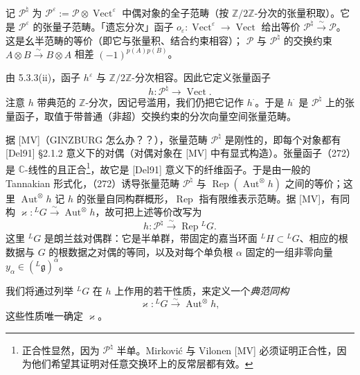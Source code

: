 记 $\mathcal{P}^{\natural}$ 为 $\mathcal{P}^{\varepsilon}:=\mathcal{P}\otimes\operatorname{Vect}^{\varepsilon}$ 中偶对象的全子范畴（按 $\mathbb{Z}/2\mathbb{Z}$-分次的张量积取）。它是 $\mathcal{P}^{\varepsilon}$ 的张量子范畴。「遗忘分次」函子 $o_{\varepsilon}:\operatorname{Vect}^{\varepsilon}\to\operatorname{Vect}$ 给出等价 $\mathcal{P}^{\natural}\xrightarrow{\sim}\mathcal{P}$。这是幺半范畴的等价（即它与张量积、结合约束相容）；
$\mathcal{P}$ 与 $\mathcal{P}^{\natural}$ 的交换约束 $A\otimes B\xrightarrow{\sim}B\otimes A$ 相差 $(-1)^{p(A)p(B)}$。

由 5.3.3(ii)，函子 $h^{\varepsilon}$ 与 $\mathbb{Z}/2\mathbb{Z}$-分次相容。因此它定义张量函子
\begin{equation}\tag{272}
h:\mathcal{P}^{\natural}\to\operatorname{Vect}.
\end{equation}
注意 $h$ 带典范的 $\mathbb{Z}$-分次，因记号滥用，我们仍把它记作 $h^{\cdot}$。于是 $h^{\cdot}$ 是 $\mathcal{P}^{\natural}$ 上的张量函子，取值于带普通（非超）交换约束的分次向量空间张量范畴。

 据 [MV]（GINZBURG 怎么办？？），张量范畴 $\mathcal{P}^{\natural}$ 是刚性的，即每个对象都有 [Del91] §2.1.2 意义下的对偶（对偶对象在 [MV] 中有显式构造）。张量函子（272）是 $\mathbb{C}$-线性的且正合\footnote{正合性显然，因为 $\mathcal{P}^{\natural}$ 半单。Mirković 与 Vilonen [MV] 必须证明正合性，因为他们希望其证明对任意交换环上的反常层都有效。}，故它是 [Del91] 意义下的纤维函子。于是由一般的 Tannakian 形式化，（272）诱导张量范畴 $\mathcal{P}^{\natural}$ 与 $\operatorname{Rep}(\operatorname{Aut}^{\otimes}h)$ 之间的等价；这里 $\operatorname{Aut}^{\otimes}h$ 记 $h$ 的张量自同构群概形，$\operatorname{Rep}$ 指有限维表示范畴。据 [MV]，有同构 $\varkappa:{}^{L}G\xrightarrow{\sim}\operatorname{Aut}^{\otimes}h$，故可把上述等价改写为
\begin{equation}\tag{273}
h:\mathcal{P}^{\natural}\xrightarrow{\sim}\operatorname{Rep}{}^{L}G.
\end{equation}
这里 ${}^{L}G$ 是朗兰兹对偶群：它是半单群，带固定的嘉当环面 ${}^{L}H\subset{}^{L}G$、相应的根数据与 $G$ 的根数据之对偶的等同，以及对每个单负根 $\alpha$ 固定的一组非零向量 $y_{\alpha}\in({}^{L}\mathfrak{g})^{\alpha}$。


 我们将通过列举 ${}^{L}G$ 在 $h$ 上作用的若干性质，来定义一个\emph{典范同构}
\begin{equation}\tag{274}
\varkappa:{}^{L}G\xrightarrow{\sim}\operatorname{Aut}^{\otimes}h,
\end{equation}
这些性质唯一确定 $\varkappa$。

